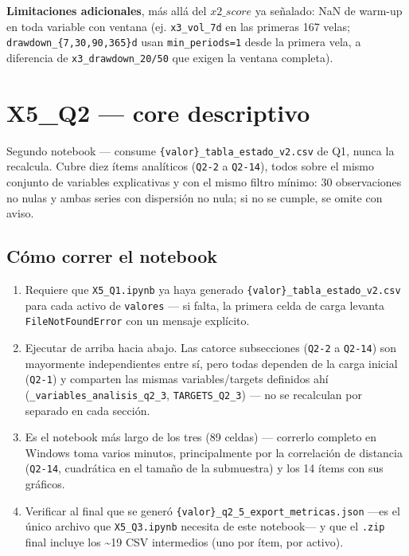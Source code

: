 \documentclass[11pt,a4paper]{article}
\newcommand{\code}[1]{\texttt{\small #1}}
\newcommand{\bigsep}{\par\vspace{3pt}}
\begin{document}
\bigsep
\textbf{Limitaciones adicionales}, más allá del \(x2\_score\) ya señalado: NaN de
warm-up en toda variable con ventana (ej. \code{x3\_vol\_7d} en las primeras 167 velas;
\code{drawdown\_\{7,30,90,365\}d} usan \code{min\_periods=1} desde la primera vela, a
diferencia de \code{x3\_drawdown\_20/50} que exigen la ventana completa).

\newpage
\section{X5\_Q2 — core descriptivo}
\label{sec:q2}

Segundo notebook — consume \code{\{valor\}\_tabla\_estado\_v2.csv} de Q1, nunca la
recalcula. Cubre diez ítems analíticos (\code{Q2-2} a \code{Q2-14}), todos sobre el mismo
conjunto de variables explicativas y con el mismo filtro mínimo: 30 observaciones no nulas
y ambas series con dispersión no nula; si no se cumple, se omite con aviso.

\subsection{Cómo correr el notebook}

\begin{enumerate}[leftmargin=1.4em,itemsep=2pt]
\item Requiere que \code{X5\_Q1.ipynb} ya haya generado
  \code{\{valor\}\_tabla\_estado\_v2.csv} para cada activo de \code{valores} — si falta,
  la primera celda de carga levanta \code{FileNotFoundError} con un mensaje explícito.
\item Ejecutar de arriba hacia abajo. Las catorce subsecciones (\code{Q2-2} a
  \code{Q2-14}) son mayormente independientes entre sí, pero todas dependen de la carga
  inicial (\code{Q2-1}) y comparten las mismas variables/targets definidos ahí
  (\code{\_variables\_analisis\_q2\_3}, \code{TARGETS\_Q2\_3}) — no se recalculan por
  separado en cada sección.
\item Es el notebook más largo de los tres (89 celdas) — correrlo completo en Windows
  toma varios minutos, principalmente por la correlación de distancia (\code{Q2-14},
  cuadrática en el tamaño de la submuestra) y los 14 ítems con sus gráficos.
\item Verificar al final que se generó
  \code{\{valor\}\_q2\_5\_export\_metricas.json} —es el único archivo que
  \code{X5\_Q3.ipynb} necesita de este notebook— y que el \code{.zip} final incluye los
  \textasciitilde19 CSV intermedios (uno por ítem, por activo).
\end{enumerate}
\end{document}
